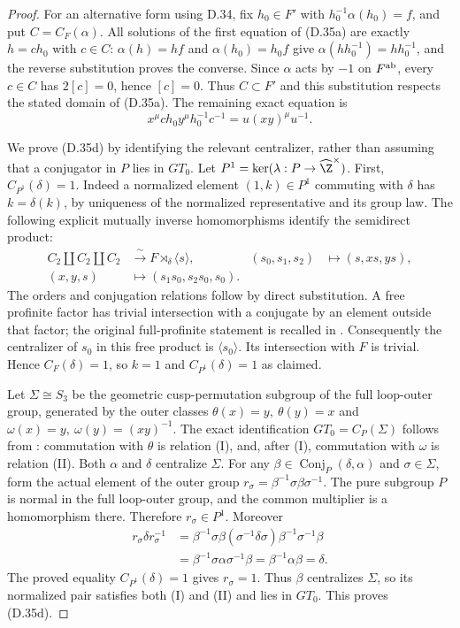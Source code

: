\begin{proof}
For an alternative form using D.34, fix
$h_0\in F'$ with $h_0^{-1}\alpha(h_0)=f$, and put
$C=C_F(\alpha)$.
All solutions of the first equation of (D.35a)
are exactly $h=ch_0$ with $c\in C$:
$\alpha(h)=hf$ and $\alpha(h_0)=h_0f$ give
$\alpha(hh_0^{-1})=hh_0^{-1}$, and the reverse
substitution proves the converse.
Since $\alpha$ acts by $-1$ on $F^{\rm ab}$,
every $c\in C$ has $2[c]=0$, hence $[c]=0$.
Thus $C\subset F'$ and this substitution respects
the stated domain of (D.35a).  The remaining exact
equation is
\[
 x^\mu c h_0 y^\mu h_0^{-1}c^{-1}
                         =u(xy)^\mu u^{-1}.
                                                                  \tag{D.35g}
\]

We prove (D.35d) by identifying the relevant centralizer,
rather than assuming that a conjugator in $P$ lies in
$GT_0$.  Let $P^1=\ker(\lambda:P\to\widehat\Z^\times)$.
First,
$C_{P^1}(\delta)=1$.
Indeed a normalized element $(1,k)\in P^1$ commuting
with $\delta$ has $k=\delta(k)$, by uniqueness of the
normalized representative and its group law.
The following explicit mutually inverse homomorphisms
identify the semidirect product:
\[
 \begin{aligned}
 C_2\amalg C_2\amalg C_2
    &\xrightarrow{\ \sim\ }F\rtimes_\delta\langle s\rangle,
       & (s_0,s_1,s_2)&\longmapsto(s,xs,ys),\\
 (x,y,s)&\longmapsto(s_1s_0,s_2s_0,s_0).
 \end{aligned}
\]
The orders and conjugation relations follow by direct
substitution.  A free profinite factor has trivial
intersection with a conjugate by an element outside
that factor; the original full-profinite statement is
recalled in \cite[Theorem 5 of the inspected author
version]{A-HerfortZalesskii2008}.
Consequently the centralizer of $s_0$ in this free
product is $\langle s_0\rangle$.
Its intersection with $F$ is trivial.
Hence $C_F(\delta)=1$, so $k=1$ and
$C_{P^1}(\delta)=1$ as claimed.

Let $\Sigma\cong S_3$ be the geometric cusp-permutation
subgroup of the full loop-outer group, generated by
the outer classes
$\theta(x)=y,\ \theta(y)=x$ and
$\omega(x)=y,\ \omega(y)=(xy)^{-1}$.
The exact identification
$GT_0=C_P(\Sigma)$ follows from
\cite[Propositions 3--4 and Theorem 2]{R-HS}:
commutation with $\theta$ is relation (I), and,
after (I), commutation with $\omega$ is relation (II).
Both $\alpha$ and $\delta$ centralize $\Sigma$.
For any $\beta\in\operatorname{Conj}_P(\delta,\alpha)$
and $\sigma\in\Sigma$, form the actual element of
the outer group
$r_\sigma=\beta^{-1}\sigma\beta\sigma^{-1}$.
The pure subgroup $P$ is normal in the full
loop-outer group, and the common multiplier is a
homomorphism there.  Therefore $r_\sigma\in P^1$.
Moreover
\[
 \begin{split}
 r_\sigma\delta r_\sigma^{-1}
  &=\beta^{-1}\sigma\beta
        (\sigma^{-1}\delta\sigma)
        \beta^{-1}\sigma^{-1}\beta\\
  &=\beta^{-1}\sigma\alpha\sigma^{-1}\beta
    =\beta^{-1}\alpha\beta=\delta.
 \end{split}
\]
The proved equality $C_{P^1}(\delta)=1$ gives
$r_\sigma=1$.  Thus $\beta$ centralizes $\Sigma$,
so its normalized pair satisfies both (I) and (II)
and lies in $GT_0$.  This proves (D.35d).


\end{proof}
